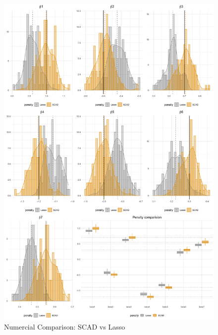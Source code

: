 \documentclass[twoside]{article}
\begin{document}
\begin{figure}[ht]
    \centering
    \caption{Numercial Comparison: SCAD vs Lasso}\label{fig:SCADvsLasso}
    \includegraphics[width = 0.8 \textwidth]{figures/note12_SCADvsLasso.png}
\end{figure}

\newpage


\end{document}
